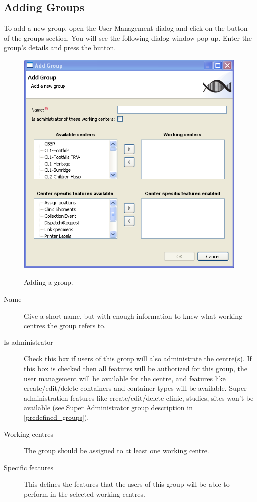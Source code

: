 \subsection{Adding Groups}
To add a new group, open the User Management dialog and click on the \fbox{+} button 
of the groups section. You will see the following dialog window pop up. Enter the group's 
details and press the  button.
\begin{figure}[H]
  \centering
  \scalebox{0.5}
	   { \includegraphics*{screenshots/administration/add_group} }
	   \caption{Adding a group.}
	   \label{fig:add_group}
\end{figure}

\begin{description}
\item[Name] Give a short name, but with enough information to know what working centres the group refers to.
\item[Is administrator] Check this box if users of this group will also administrate the centre(s). 
If this box is checked then all features will be authorized for this group, the user management will be available for the centre, and features like create/edit/delete containers and container types will be available. Super administration features like create/edit/delete clinic, studies, sites won't be available (see Super Administrator group description in \ref{predefined_groups}). 
\item[Working centres] The group should be assigned to at least one working centre. 
\item[Specific features] This defines the features that the users of this group will be able to perform in the selected working centres.
\end{description}

